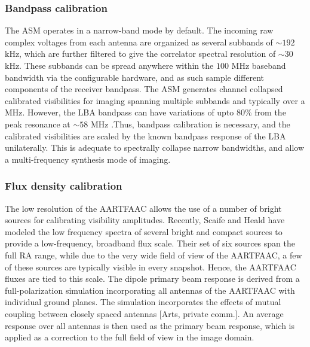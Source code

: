 \documentclass{aa}
\begin{document}

\subsubsection{Bandpass calibration}

The ASM  operates in  a narrow-band  mode by default.  The incoming  raw complex
voltages from each antenna are organized as several subbands of $\sim$$192$ kHz,
which  are further  filtered to  give  the correlator  spectral resolution  of
$\sim$$30$  kHz. These  subbands can  be spread  anywhere within  the  $100$ MHz
baseband bandwidth via  the configurable hardware, and as  such sample different
components  of  the  receiver  bandpass.  The ASM  generates  channel  collapsed
calibrated  visibilities for  imaging spanning  multiple subbands  and typically
over a MHz. However, the LBA bandpass  can have variations of upto 80\% from the
peak  resonance   at  $\sim$$58$  MHz \citep{vanhaarlem2013lofar}.Thus,  bandpass
calibration  is necessary,  and the  calibrated visibilities  are scaled  by the
known bandpass response of the  LBA unilaterally. This is adequate to spectrally
collapse  narrow  bandwidths, and  allow  a  multi-frequency  synthesis mode  of
imaging.


\subsubsection{Flux density calibration}

The low resolution of the AARTFAAC allows  the use of a number of bright sources
for    calibrating     visibility    amplitudes.     Recently,     Scaife    and
Heald \citet{scaife2012broad} have  modeled the low frequency  spectra of several
bright  and   compact  sources  to  provide  a   low-frequency,  broadband  flux
scale. Their set  of six sources span the  full RA range, while due  to the very
wide field of view of the AARTFAAC, a few of these sources are typically visible
in  every snapshot.   Hence, the  AARTFAAC fluxes  are tied  to this  scale. The
dipole  primary beam  response is  derived from  a  full-polarization simulation
incorporating all  antennas of the  AARTFAAC with individual ground  planes. The
simulation incorporates  the effects of  mutual coupling between  closely spaced
antennas {[}Arts,  private comm.{]}.  An average response  over all  antennas is
then used as the primary beam response,  which is applied as a correction to the
full field of view in the image domain.
\end{document}
